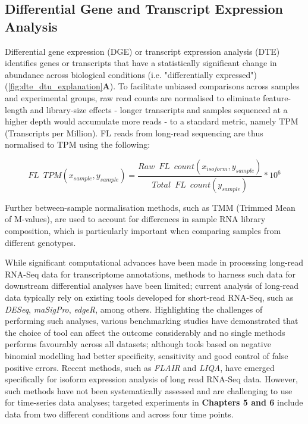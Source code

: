 \subsection{Differential Gene and Transcript Expression Analysis}
Differential gene expression (DGE) or transcript expression analysis (DTE) identifies genes or transcripts that have a statistically significant change in abundance across biological conditions (i.e. "differentially expressed") (\cref{fig:dte_dtu_explanation}\textbf{A}). To facilitate unbiased comparisons across samples and experimental groups, raw read counts are normalised to eliminate feature-length and library-size effects - longer transcripts and samples sequenced at a higher depth would accumulate more reads - to a standard metric, namely TPM (Transcripts per Million). FL reads from long-read sequencing are thus normalised to TPM using the following: 

\begin{myequation}[!h]
	\begin{equation}
		FL\;\:TPM (x_{sample},y_{sample})=\frac{Raw\;\:FL\;\:count (x_{isoform},y_{sample})}{Total\;\:FL\;\:count (y_{sample})} *10^6
	\end{equation}
\end{myequation}

Further between-sample normalisation methods, such as TMM\cite{Robinson2010} (Trimmed Mean of M-values), are used to account for differences in sample RNA library composition, which is particularly important when comparing samples from different genotypes. 

While significant computational advances have been made in processing long-read RNA-Seq data for transcriptome annotations, methods to harness such data for downstream differential analyses have been limited; current analysis of long-read data typically rely on existing tools developed for short-read RNA-Seq\cite{Amarasinghe2020}, such as \textit{DESeq}, \textit{maSigPro}, \textit{edgeR}, among others. Highlighting the challenges of performing such analyses, various benchmarking studies have demonstrated that the choice of tool can affect the outcome considerably and no single methods performs favourably across all datasets; although tools based on negative binomial modelling had better specificity, sensitivity and good control of false positive errors\cite{Rapaport2013}. Recent methods, such as \textit{FLAIR} and \textit{LIQA}\cite{Hu2021}, have emerged specifically for isoform expression analysis of long read RNA-Seq data. However, such methods have not been systematically assessed and are challenging to use for time-series data analyses; targeted experiments in \textbf{Chapters 5 and 6} include data from two different conditions and across four time points. 

